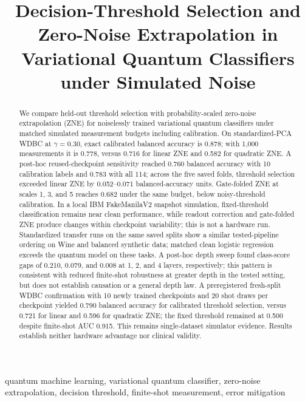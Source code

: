 \documentclass[conference]{IEEEtran}
\title{Decision-Threshold Selection and Zero-Noise Extrapolation in Variational Quantum Classifiers under Simulated Noise}
\author{\IEEEauthorblockN{Author 1, Author 2, Author 3}\IEEEauthorblockA{Affiliations: \\ Corresponding author email: }}
\begin{document}
\maketitle
\begin{abstract}
We compare held-out threshold selection with probability-scaled zero-noise extrapolation (ZNE) for noiselessly trained variational quantum classifiers under matched simulated measurement budgets including calibration. On standardized-PCA WDBC at $\gamma=0.30$, exact calibrated balanced accuracy is 0.878; with 1,000 measurements it is 0.778, versus 0.716 for linear ZNE and 0.582 for quadratic ZNE. A post-hoc reused-checkpoint sensitivity reached 0.760 balanced accuracy with 10 calibration labels and 0.783 with all 114; across the five saved folds, threshold selection exceeded linear ZNE by 0.052--0.071 balanced-accuracy units. Gate-folded ZNE at scales 1, 3, and 5 reaches 0.682 under the same budget, below noisy-threshold calibration. In a local IBM FakeManilaV2 snapshot simulation, fixed-threshold classification remains near clean performance, while readout correction and gate-folded ZNE produce changes within checkpoint variability; this is not a hardware run. Standardized transfer runs on the same saved splits show a similar tested-pipeline ordering on Wine and balanced synthetic data; matched clean logistic regression exceeds the quantum model on these tasks. A post-hoc depth sweep found class-score gaps of 0.210, 0.079, and 0.008 at 1, 2, and 4 layers, respectively; this pattern is consistent with reduced finite-shot robustness at greater depth in the tested setting, but does not establish causation or a general depth law. A preregistered fresh-split WDBC confirmation with 10 newly trained checkpoints and 20 shot draws per checkpoint yielded 0.790 balanced accuracy for calibrated threshold selection, versus 0.721 for linear and 0.596 for quadratic ZNE; the fixed threshold remained at 0.500 despite finite-shot AUC 0.915. This remains single-dataset simulator evidence. Results establish neither hardware advantage nor clinical validity.\end{abstract}
\begin{IEEEkeywords}
quantum machine learning, variational quantum classifier, zero-noise extrapolation, decision threshold, finite-shot measurement, error mitigation
\end{IEEEkeywords}
\end{document}
